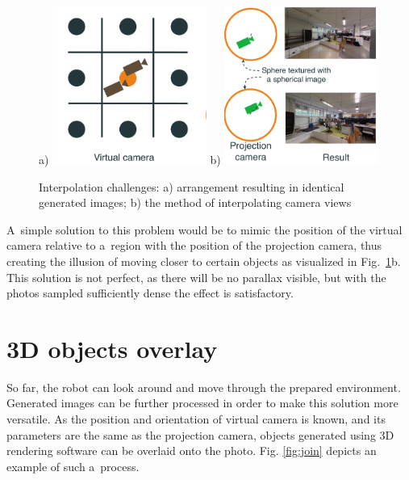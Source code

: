 \documentclass{svproc}
\begin{document}
\begin{figure}[!ht]
    \centering
    a) \includegraphics[width=0.45\textwidth]{img/interpolation/virt.pdf}
    b) \includegraphics[width=0.45\textwidth]{img/interpolation/proj.pdf}
    \caption{Interpolation challenges: a) arrangement resulting in identical generated images; b) the method of interpolating camera views}
    \label{fig:interpolation}
\end{figure}

A~simple solution to this problem would be to mimic the position of the virtual camera relative 
to a~region with the position of the projection camera, thus creating the illusion of moving closer 
to certain objects as visualized in Fig.~\ref{fig:interpolation}b. This solution is not perfect,
as there will be no parallax visible, but with the photos sampled sufficiently dense the effect is satisfactory.

\section{3D objects overlay}
\label{sec:gazebo}

So far, the robot can look around and move through the prepared environment. 
Generated images can be further processed in order to make this solution more versatile.
As the position and orientation of virtual camera is known, and its parameters are the same
as the projection camera, objects generated using 3D rendering software can be overlaid onto the photo.
Fig. \ref{fig:join} depicts an example of such a~process.
\end{document}
